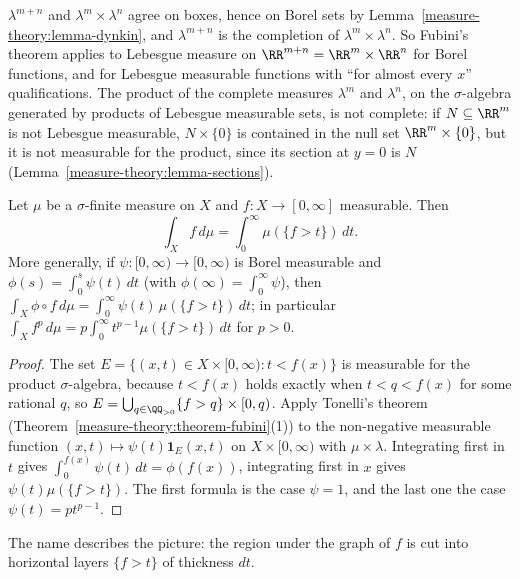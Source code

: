 \begin{remark}\label{measure-theory:remark-lebesgue-product}
$\lambda^{m+n}$ and $\lambda^m \times \lambda^n$ agree on boxes, hence on Borel sets by Lemma~\ref{measure-theory:lemma-dynkin}, and $\lambda^{m+n}$ is the completion of $\lambda^m \times \lambda^n$. So
Fubini's theorem applies to Lebesgue measure on $\RR^{m+n} = \RR^m \times \RR^n$ for Borel functions, and for Lebesgue measurable functions with ``for almost every $x$'' qualifications.
The product of the complete measures $\lambda^m$ and $\lambda^n$, on the $\sigma$-algebra generated by products of Lebesgue measurable sets, is not complete: if $N \subseteq \RR^m$ is not Lebesgue
measurable, $N \times \{0\}$ is contained in the null set $\RR^m \times \{0\}$, but it is not measurable for the product, since its section at $y = 0$ is $N$ (Lemma~\ref{measure-theory:lemma-sections}).
\end{remark}

\begin{proposition}\label{measure-theory:proposition-layer-cake}
Let $\mu$ be a $\sigma$-finite measure on $X$ and $f \colon X \to [0, \infty]$ measurable. Then
\[
\int_Xf\,d\mu = \int_0^\infty\mu(\{f > t\})\,dt.
\]
More generally, if $\psi \colon [0, \infty) \to [0, \infty)$ is Borel measurable and $\phi(s) = \int_0^s\psi(t)\,dt$ (with $\phi(\infty) = \int_0^\infty\psi$), then
$\int_X\phi \circ f\,d\mu = \int_0^\infty\psi(t)\,\mu(\{f > t\})\,dt$; in particular $\int_Xf^p\,d\mu = p\int_0^\infty t^{p-1}\mu(\{f > t\})\,dt$ for $p > 0$.
\end{proposition}

\begin{proof}
The set $E = \{(x, t) \in X \times [0, \infty) : t < f(x)\}$ is measurable for the product $\sigma$-algebra, because $t < f(x)$ holds exactly when $t < q < f(x)$ for some rational
$q$, so $E = \bigcup_{q \in \QQ_{>0}}\{f > q\} \times [0, q)$. Apply Tonelli's theorem (Theorem~\ref{measure-theory:theorem-fubini}(1)) to the non-negative measurable function
$(x, t) \mapsto \psi(t)\mathbf{1}_E(x, t)$ on $X \times [0, \infty)$ with $\mu \times \lambda$. Integrating first in $t$ gives $\int_0^{f(x)}\psi(t)\,dt = \phi(f(x))$, integrating first in
$x$ gives $\psi(t)\mu(\{f > t\})$. The first formula is the case $\psi = 1$, and the last one the case $\psi(t) = pt^{p-1}$.
\end{proof}

The name describes the picture: the region under the graph of $f$ is cut into horizontal layers $\{f > t\}$ of thickness $dt$.

